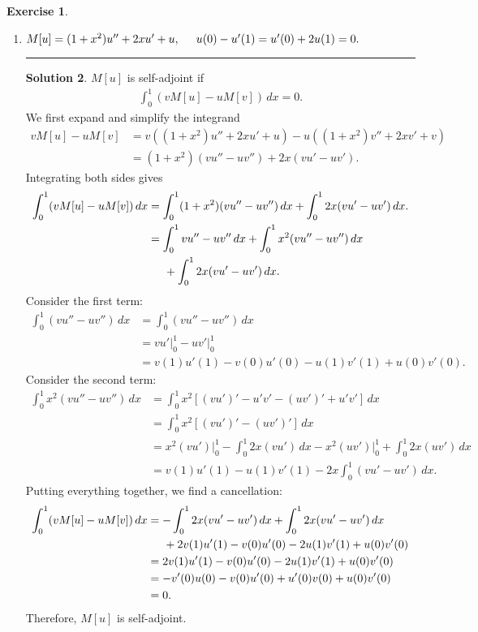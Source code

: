 \documentclass{book}
\theoremstyle{definition}
\newtheorem*{exer*}{Exercise}
\newtheorem*{sln*}{Solution}
\begin{document}
\begin{exer*}
\begin{enumerate}
\begin{sln*}
			
			
			
		\end{sln*}
		
		
		
		
		
		
		\newpage
		\item $M[u] = (1+x^2)u'' + 2xu' + u,\hspace{0.5cm} u(0) - u'(1) = u'(0) + 2u(1) = 0.$\\
		\noindent\rule{\textwidth}{0.5pt}
		\begin{sln*}
			$M[u]$ is self-adjoint if 
			\begin{align*}
			\int^1_0 (vM[u] - uM[v])\,dx = 0.
			\end{align*}
			We first expand and simplify the integrand
			\begin{align*}
			vM[u] - uM[v] &= v((1+x^2)u'' + 2xu' + u) - u((1+x^2)v'' + 2xv' + v)\\
			&= (1+x^2)(vu'' - uv'') + 2x(vu' - uv').
			\end{align*}
			Integrating both sides gives
			\begin{align*}
			\int^1_0 (vM[u] - uM[v])\,dx &= \int^1_0 (1+x^2)(vu'' - uv'')\,dx + \int^1_0 2x(vu' - uv')\,dx.\\
			&=\int^1_0 vu'' - uv''\,dx + \int^1_0 x^2(vu'' - uv'')\,dx\\
			&\hspace{0.5cm} + \int^1_0 2x(vu' - uv')\,dx.
			\end{align*}
			Consider the first term:
			\begin{align*}
			\int^1_0 (vu'' - uv'')\,dx &= \int^1_0 (vu'' - uv'')\,dx\\
			&= vu'\bigg\vert^1_0 - uv'\bigg\vert^1_0\\
			&= v(1)u'(1) - v(0)u'(0) - u(1)v'(1) + u(0)v'(0).
			\end{align*}
			Consider the second term:
			\begin{align*}
			\int^1_0 x^2(vu'' - uv'')\,dx &= \int^1_0 x^2 \left[ (vu')' - u'v' - (uv')' + u'v'  \right]\,dx\\
			&= \int^1_0 x^2\left[ (vu')' - (uv')' \right]\,dx\\
			&= x^2(vu')\bigg\vert^1_0 - \int^1_0 2x(vu')\,dx - x^2(uv')\bigg\vert^1_0 + \int^1_0 2x(uv')\,dx\\
			&= v(1)u'(1) - u(1)v'(1) - 2x\int^1_0 (vu' - uv')\,dx.
			\end{align*}
			Putting everything together, we find a cancellation:
			\begin{align*}
			\int^1_0 (vM[u] - uM[v])\,dx &= -\int^1_0 2x(vu' - uv')\,dx + \int^1_0 2x(vu' - uv')\,dx\\&\hspace{0.5cm} + 2v(1)u'(1) - v(0)u'(0) - 2u(1)v'(1) + u(0)v'(0)  \\
			&= 2v(1)u'(1) - v(0)u'(0) - 2u(1)v'(1) + u(0)v'(0)\\
			&= -v'(0)u(0) - v(0)u'(0) + u'(0)v(0) + u(0)v'(0)\\
			&= 0.
			\end{align*} 
			Therefore, $M[u]$ is self-adjoint. 
			

\end{sln*}
\end{enumerate}
\end{exer*}
\end{document}
